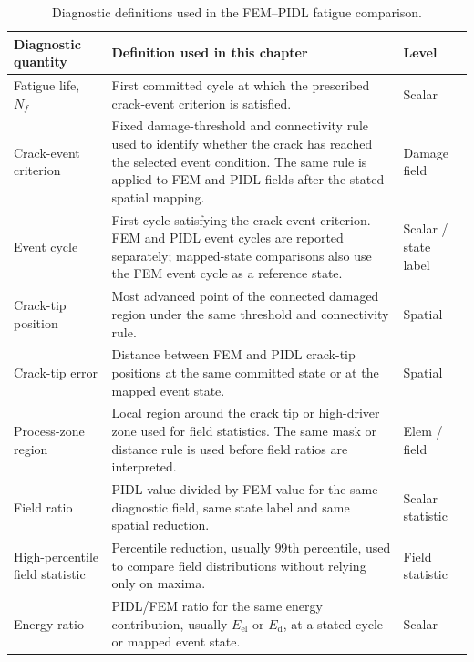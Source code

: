 \begin{table}[!htb]
\centering
\caption{Diagnostic definitions used in the FEM--PIDL fatigue comparison.}
\label{tab:c4_diagnostic_definitions}
\begin{tabular}{p{} p{} p{}}
\hline
\textbf{Diagnostic quantity} & \textbf{Definition used in this chapter} & \textbf{Level} \\
\hline
Fatigue life, \(N_f\)
& First committed cycle at which the prescribed crack-event criterion is satisfied.
& Scalar \\

Crack-event criterion
& Fixed damage-threshold and connectivity rule used to identify whether the crack has reached the selected event condition. The same rule is applied to FEM and PIDL fields after the stated spatial mapping.
& Damage field \\

Event cycle
& First cycle satisfying the crack-event criterion. FEM and PIDL event cycles are reported separately; mapped-state comparisons also use the FEM event cycle as a reference state.
& Scalar / state label \\

Crack-tip position
& Most advanced point of the connected damaged region under the same threshold and connectivity rule.
& Spatial \\

Crack-tip error
& Distance between FEM and PIDL crack-tip positions at the same committed state or at the mapped event state.
& Spatial \\

Process-zone region
& Local region around the crack tip or high-driver zone used for field statistics. The same mask or distance rule is used before field ratios are interpreted.
& Elem / field \\

Field ratio
& PIDL value divided by FEM value for the same diagnostic field, same state label and same spatial reduction.
& Scalar statistic \\

High-percentile field statistic
& Percentile reduction, usually \(99\)th percentile, used to compare field distributions without relying only on maxima.
& Field statistic \\

Energy ratio
& PIDL/FEM ratio for the same energy contribution, usually \(E_{\mathrm{el}}\) or \(E_{\mathrm{d}}\), at a stated cycle or mapped event state.
& Scalar \\
\hline
\end{tabular}
\end{table}



